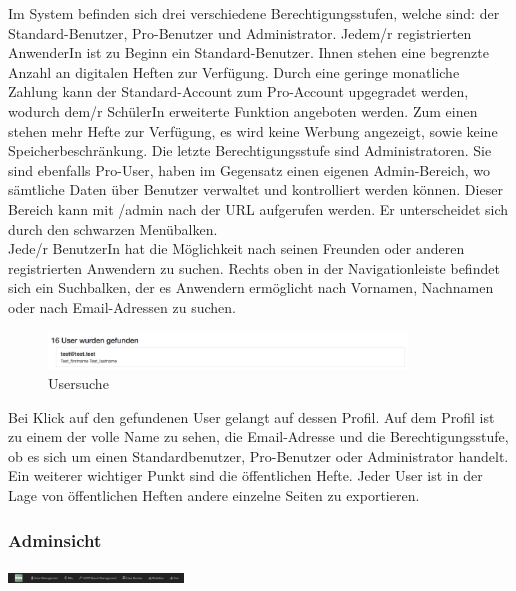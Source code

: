 Im System befinden sich drei verschiedene Berechtigungsstufen, welche sind: der Standard-Benutzer, Pro-Benutzer und Administrator. Jedem/r registrierten AnwenderIn ist zu Beginn ein Standard-Benutzer. Ihnen stehen eine begrenzte Anzahl an digitalen Heften zur Verfügung. Durch eine geringe monatliche Zahlung kann der Standard-Account zum Pro-Account upgegradet werden, wodurch dem/r SchülerIn erweiterte Funktion angeboten werden. Zum einen stehen mehr Hefte zur Verfügung, es wird keine Werbung angezeigt, sowie keine Speicherbeschränkung. Die letzte Berechtigungsstufe sind Administratoren. Sie sind ebenfalls Pro-User, haben im Gegensatz einen eigenen Admin-Bereich, wo sämtliche Daten über Benutzer verwaltet und kontrolliert werden können. Dieser Bereich kann mit /admin nach der URL aufgerufen werden. Er unterscheidet sich durch den schwarzen Menübalken.\\
Jede/r BenutzerIn hat die Möglichkeit nach seinen Freunden oder anderen registrierten Anwendern zu suchen. Rechts oben in der Navigationleiste befindet sich ein Suchbalken, der es Anwendern ermöglicht nach Vornamen, Nachnamen oder nach Email-Adressen zu suchen.

\begin{figure}[ht]
\includegraphics[width=0.85\textwidth]{images/usermanagement/Search}
	\caption{Usersuche}
	\label{fig6}
\end{figure}

Bei Klick auf den gefundenen User gelangt auf dessen Profil. Auf dem Profil ist zu einem der volle Name zu sehen, die Email-Adresse und die Berechtigungsstufe, ob es sich um einen Standardbenutzer, Pro-Benutzer oder Administrator handelt. Ein weiterer wichtiger Punkt sind die öffentlichen Hefte. Jeder User ist in der Lage von öffentlichen Heften andere einzelne Seiten zu exportieren.

\subsubsection{Adminsicht}

\includegraphics[width=0.35\textwidth]{images/usermanagement/Adminsicht}\\

